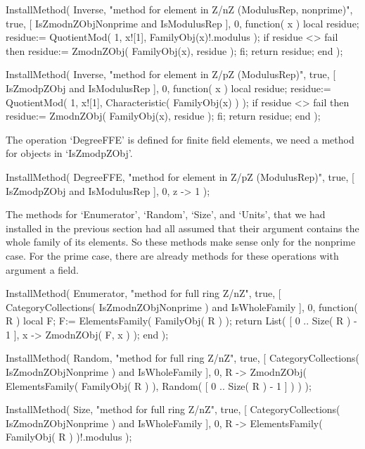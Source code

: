     InstallMethod( Inverse,
        "method for element in Z/nZ (ModulusRep, nonprime)",
        true,
        [ IsZmodnZObjNonprime and IsModulusRep ], 0,
        function( x )
        local residue;
        residue:= QuotientMod( 1, x![1], FamilyObj(x)!.modulus );
        if residue <> fail then
          residue:= ZmodnZObj( FamilyObj(x), residue );
        fi;
        return residue;
        end );

    InstallMethod( Inverse,
        "method for element in Z/pZ (ModulusRep)",
        true,
        [ IsZmodpZObj and IsModulusRep ], 0,
        function( x )
        local residue;
        residue:= QuotientMod( 1, x![1], Characteristic( FamilyObj(x) ) );
        if residue <> fail then
          residue:= ZmodnZObj( FamilyObj(x), residue );
        fi;
        return residue;
        end );
\endexample

The operation `DegreeFFE' is defined for finite field elements,
we need a method for objects in `IsZmodpZObj'.

\beginexample
    InstallMethod( DegreeFFE,
        "method for element in Z/pZ (ModulusRep)",
        true,
        [ IsZmodpZObj and IsModulusRep ], 0,
        z -> 1 );
\endexample

The methods for `Enumerator', `Random', `Size', and `Units',
that we had installed in the previous section had all assumed that
their argument contains the whole family of its elements.
So these methods make sense only for the nonprime case.
For the prime case, there are already methods for these operations
with argument a field.

\beginexample
    InstallMethod( Enumerator,
        "method for full ring Z/nZ",
        true,
        [ CategoryCollections( IsZmodnZObjNonprime ) and IsWholeFamily ],
        0,
        function( R )
        local F;
        F:= ElementsFamily( FamilyObj( R ) );
        return List( [ 0 .. Size( R ) - 1 ], x -> ZmodnZObj( F, x ) );
        end );

    InstallMethod( Random,
        "method for full ring Z/nZ",
        true,
        [ CategoryCollections( IsZmodnZObjNonprime ) and IsWholeFamily ],
        0,
        R -> ZmodnZObj( ElementsFamily( FamilyObj( R ) ),
                        Random( [ 0 .. Size( R ) - 1 ] ) ) );

    InstallMethod( Size,
        "method for full ring Z/nZ",
        true,
        [ CategoryCollections( IsZmodnZObjNonprime ) and IsWholeFamily ],
        0,
        R -> ElementsFamily( FamilyObj( R ) )!.modulus );


